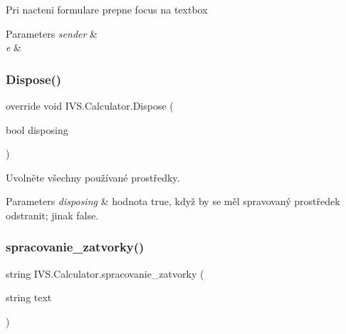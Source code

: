 Pri nacteni formulare prepne focus na textbox 


\begin{DoxyParams}{Parameters}
{\em sender} & \\
\hline
{\em e} & \\
\hline
\end{DoxyParams}
\mbox{\label{class_i_v_s_1_1_calculator_aefacad0176c6b732e4fdd19829c3a37a}} 
\subsubsection{\texorpdfstring{Dispose()}{Dispose()}}
{\footnotesize\ttfamily override void I\+V\+S.\+Calculator.\+Dispose (\begin{DoxyParamCaption}\item[{bool}]{disposing }\end{DoxyParamCaption})\hspace{0.3cm}{\ttfamily [protected]}}



Uvolněte všechny používané prostředky. 


\begin{DoxyParams}{Parameters}
{\em disposing} & hodnota true, když by se měl spravovaný prostředek odstranit; jinak false.\\
\hline
\end{DoxyParams}
\mbox{\label{class_i_v_s_1_1_calculator_a9c56e5c59d73fbc0bd4db45dc8beb466}} 
\subsubsection{\texorpdfstring{spracovanie\+\_\+zatvorky()}{spracovanie\_zatvorky()}}
{\footnotesize\ttfamily string I\+V\+S.\+Calculator.\+spracovanie\+\_\+zatvorky (\begin{DoxyParamCaption}\item[{string}]{text }\end{DoxyParamCaption})\hspace{0.3cm}{\ttfamily [protected]}}



